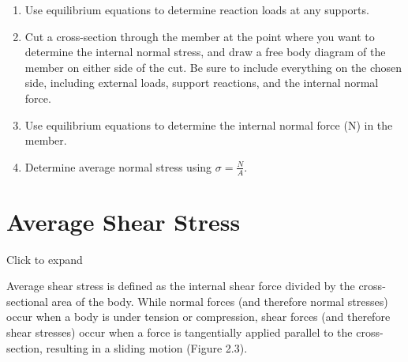 \documentclass[
  letterpaper,
  DIV=11,
  numbers=noendperiod]{scrreprt}
\begin{document}
\begin{tcolorbox}[enhanced jigsaw, breakable, opacityback=0, toptitle=1mm, left=2mm, colback=white, opacitybacktitle=0.6, colframe=quarto-callout-warning-color-frame, titlerule=0mm, arc=.35mm, leftrule=.75mm, bottomtitle=1mm, colbacktitle=quarto-callout-warning-color!10!white, rightrule=.15mm, title={Step-by-step: Average Normal Stress}, bottomrule=.15mm, toprule=.15mm, coltitle=black]

\begin{enumerate}
\def\labelenumi{\arabic{enumi}.}
\item
  Use equilibrium equations to determine reaction loads at any supports.
\item
  Cut a cross-section through the member at the point where you want to
  determine the internal normal stress, and draw a free body diagram of
  the member on either side of the cut. Be sure to include everything on
  the chosen side, including external loads, support reactions, and the
  internal normal force.
\item
  Use equilibrium equations to determine the internal normal force (N)
  in the member.
\item
  Determine average normal stress using \(\sigma=\frac{N}{A}\).
\end{enumerate}

\end{tcolorbox}

\section{Average Shear Stress}\label{sec-2.2}

Click to expand

Average shear stress is defined as the internal shear force divided by
the cross-sectional area of the body. While normal forces (and therefore
normal stresses) occur when a body is under tension or compression,
shear forces (and therefore shear stresses) occur when a force is
tangentially applied parallel to the cross-section, resulting in a
sliding motion (Figure 2.3).
\end{document}
